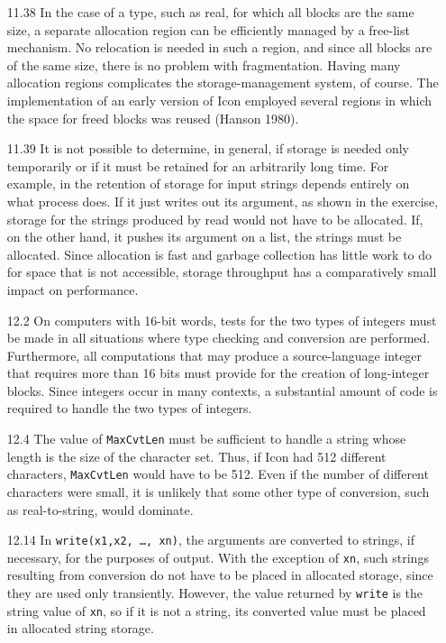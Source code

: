 \begin{itemize}
\goodbreak\item[11.38]
In the case of a type, such as real, for which all blocks are the same size, a
separate allocation region can be efficiently managed by a free-list
mechanism. No relocation is needed in such a region, and since all blocks
are of the same size, there is no problem with fragmentation. Having
many allocation regions complicates the storage-management system, of
course. The implementation of an early version of Icon employed several
regions in which the space for freed blocks was reused (Hanson 1980).

\goodbreak\item[11.39]
It is not possible to determine, in general, if storage is needed only temporarily
or if it must be retained for an arbitrarily long time. For example, in
the retention of storage for input strings depends entirely on what process
does. If it just writes out its argument, as shown in the exercise, storage
for the strings produced by read would not have to be allocated. If, on
the other hand, it pushes its argument on a list, the strings must be allocated.
Since allocation is fast and garbage collection has little work to do
for space that is not accessible, storage throughput has a comparatively
small impact on performance.

\goodbreak\item[12.2]
On computers with 16-bit words, tests for the two types of integers must
be made in all situations where type checking and conversion are performed.
Furthermore, all computations that may produce a source-language
integer that requires more than 16 bits must provide for the
creation of long-integer blocks. Since integers occur in many contexts, a
substantial amount of code is required to handle the two types of integers.

\goodbreak\item[12.4]
The value of \texttt{MaxCvtLen} must be sufficient to handle a string whose
length is the size of the character set. Thus, if Icon had 512 different characters,
\texttt{MaxCvtLen} would have to be 512. Even if the number of different
characters were small, it is unlikely that some other type of conversion,
such as real-to-string, would dominate.

\goodbreak\item[12.14]
In \texttt{write(x1,x2,\ \dots,\ xn)}, the arguments are converted to strings,
if necessary, for the purposes of output. With the exception of \texttt{xn},
such strings resulting from conversion do not have to be placed in allocated
storage, since they are used only transiently. However, the value returned by
\texttt{write} is the string value of \texttt{xn}, so if it is not a string, its
converted value must be placed in allocated string storage.

\end{itemize}
